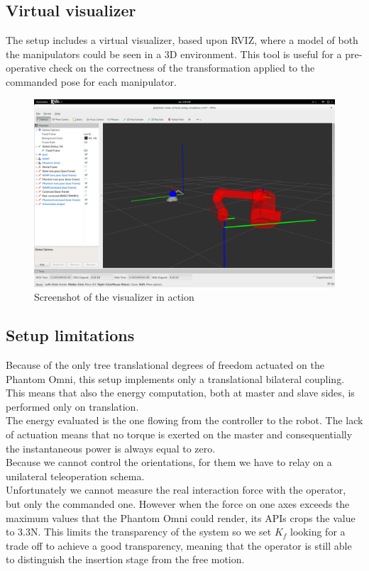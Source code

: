 \subsection{Virtual visualizer}
The setup includes a virtual visualizer, based upon RVIZ, where a model of both the manipulators could be seen in a 3D environment.
This tool is useful for a pre-operative check on the correctness of the transformation applied to the commanded pose for each manipulator.

\begin{figure}
	\includegraphics[width=\linewidth]{images/Visualizer.png}
	\caption[The visualizer]{Screenshot of the visualizer in action}
	\label{fig:Visualizer}
\end{figure}

\subsection{Setup limitations}
Because of the only tree translational degrees of freedom actuated on the Phantom Omni, this setup implements only a translational bilateral coupling.
This means that also the energy computation, both at master and slave sides, is performed only on translation.\\
The energy evaluated is the one flowing from the controller to the robot.
The lack of actuation means that no torque is exerted on the master and consequentially the instantaneous power is always equal to zero.\\
Because we cannot control the orientations, for them we have to relay on a unilateral teleoperation schema.\\
Unfortunately we cannot measure the real interaction force with the operator, but only the commanded one. However when the force on one axes exceeds the maximum values that the Phantom Omni could render, its APIs crops the value to 3.3N. This limits the transparency of the system so we set $K_{f}$ looking for a trade off to achieve a good transparency, meaning that the operator is still able to distinguish the insertion stage from the free motion.



\clearpage
\thispagestyle{empty}